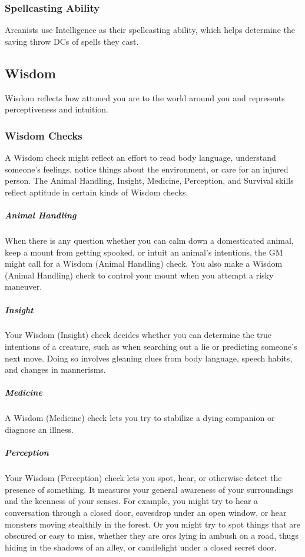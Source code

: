\subsubsection{Spellcasting Ability}

Arcanists use Intelligence as their spellcasting ability, which helps determine the saving throw DCs of spells they cast.

\subsection{Wisdom}

Wisdom reflects how attuned you are to the world around you and represents perceptiveness and intuition.

\subsubsection{Wisdom Checks}

A Wisdom check might reflect an effort to read body language, understand someone's feelings, notice things about the environment, or care for an injured person. The Animal Handling, Insight, Medicine, Perception, and Survival skills reflect aptitude in certain kinds of Wisdom checks.

\subparagraph*{Animal Handling} When there is any question whether you can calm down a domesticated animal, keep a mount from getting spooked, or intuit an animal's intentions, the GM might call for a Wisdom (Animal Handling) check. You also make a Wisdom (Animal Handling) check to control your mount when you attempt a risky maneuver.

\subparagraph*{Insight} Your Wisdom (Insight) check decides whether you can determine the true intentions of a creature, such as when searching out a lie or predicting someone's next move. Doing so involves gleaning clues from body language, speech habits, and changes in mannerisms.

\subparagraph*{Medicine} A Wisdom (Medicine) check lets you try to stabilize a dying companion or diagnose an illness.

\subparagraph*{Perception} Your Wisdom (Perception) check lets you spot, hear, or otherwise detect the presence of something. It measures your general awareness of your surroundings and the keenness of your senses. For example, you might try to hear a conversation through a closed door, eavesdrop under an open window, or hear monsters moving stealthily in the forest. Or you might try to spot things that are obscured or easy to miss, whether they are orcs lying in ambush on a road, thugs hiding in the shadows of an alley, or candlelight under a closed secret door.

